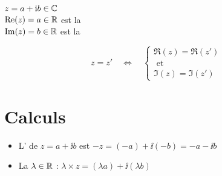 \begin{frame}

\hspace{2em}
\begin{minipage}{0.5\linewidth}
$z = a + \mathrm{i} b \in \mathbb{C}$ \\[0.5em]
$\mathop{\text{Re}}\nolimits(z) = a \in \mathbb{R}$ est la   \\[0.5em]
$\mathop{\text{Im}}\nolimits(z) = b \in \mathbb{R}$ est la 
\end{minipage}%
\pause
\hspace{-1em}
\begin{minipage}{0.2\linewidth}
\end{minipage}
\pause
$$ z = z'\quad \Longleftrightarrow \quad \left\{ \begin{array}{l}
     \Re (z) = \Re (z')\\
     \text{ et }\\
     \Im (z) = \Im (z')
   \end{array} \right. $$


\end{frame}

\section{Calculs}

\begin{frame}
\begin{itemize}
  \item L' de $z = a + \ii b$ est $- z = (- a) + \ii (-b) = - a - \ii b$

  \item La  $\lambda \in \mathbb{R}$ : $\lambda \times
  z = (\lambda a) + \ii(\lambda b)$
\end{itemize}

\bigskip

\end{frame}


